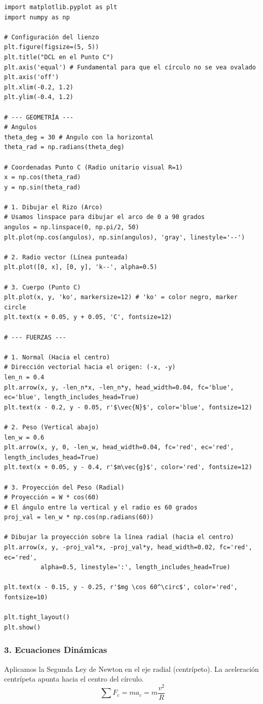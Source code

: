 \documentclass[12pt, a4paper]{article}
\begin{document}
\begin{lstlisting}
import matplotlib.pyplot as plt
import numpy as np

# Configuración del lienzo
plt.figure(figsize=(5, 5))
plt.title("DCL en el Punto C")
plt.axis('equal') # Fundamental para que el círculo no se vea ovalado
plt.axis('off')
plt.xlim(-0.2, 1.2)
plt.ylim(-0.4, 1.2)

# --- GEOMETRÍA ---
# Angulos
theta_deg = 30 # Angulo con la horizontal
theta_rad = np.radians(theta_deg)

# Coordenadas Punto C (Radio unitario visual R=1)
x = np.cos(theta_rad)
y = np.sin(theta_rad)

# 1. Dibujar el Rizo (Arco)
# Usamos linspace para dibujar el arco de 0 a 90 grados
angulos = np.linspace(0, np.pi/2, 50)
plt.plot(np.cos(angulos), np.sin(angulos), 'gray', linestyle='--')

# 2. Radio vector (Línea punteada)
plt.plot([0, x], [0, y], 'k--', alpha=0.5)

# 3. Cuerpo (Punto C)
plt.plot(x, y, 'ko', markersize=12) # 'ko' = color negro, marker circle
plt.text(x + 0.05, y + 0.05, 'C', fontsize=12)

# --- FUERZAS ---

# 1. Normal (Hacia el centro)
# Dirección vectorial hacia el origen: (-x, -y)
len_n = 0.4
plt.arrow(x, y, -len_n*x, -len_n*y, head_width=0.04, fc='blue', ec='blue', length_includes_head=True)
plt.text(x - 0.2, y - 0.05, r'$\vec{N}$', color='blue', fontsize=12)

# 2. Peso (Vertical abajo)
len_w = 0.6
plt.arrow(x, y, 0, -len_w, head_width=0.04, fc='red', ec='red', length_includes_head=True)
plt.text(x + 0.05, y - 0.4, r'$m\vec{g}$', color='red', fontsize=12)

# 3. Proyección del Peso (Radial)
# Proyección = W * cos(60)
# El ángulo entre la vertical y el radio es 60 grados
proj_val = len_w * np.cos(np.radians(60)) 

# Dibujar la proyección sobre la línea radial (hacia el centro)
plt.arrow(x, y, -proj_val*x, -proj_val*y, head_width=0.02, fc='red', ec='red', 
          alpha=0.5, linestyle=':', length_includes_head=True)

plt.text(x - 0.15, y - 0.25, r'$mg \cos 60^\circ$', color='red', fontsize=10)

plt.tight_layout()
plt.show()
\end{lstlisting}

\subsubsection*{3. Ecuaciones Dinámicas}
Aplicamos la Segunda Ley de Newton en el eje radial (centrípeto). La aceleración centrípeta apunta hacia el centro del círculo.
$$ \sum F_c = m a_c = m \frac{v^2}{R} $$
\end{document}
